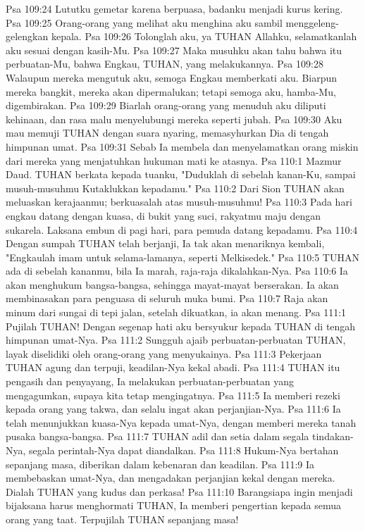Psa 109:24  Lututku gemetar karena berpuasa, badanku menjadi kurus kering.
Psa 109:25  Orang-orang yang melihat aku menghina aku sambil menggeleng-gelengkan kepala.
Psa 109:26  Tolonglah aku, ya TUHAN Allahku, selamatkanlah aku sesuai dengan kasih-Mu.
Psa 109:27  Maka musuhku akan tahu bahwa itu perbuatan-Mu, bahwa Engkau, TUHAN, yang melakukannya.
Psa 109:28  Walaupun mereka mengutuk aku, semoga Engkau memberkati aku. Biarpun mereka bangkit, mereka akan dipermalukan; tetapi semoga aku, hamba-Mu, digembirakan.
Psa 109:29  Biarlah orang-orang yang menuduh aku diliputi kehinaan, dan rasa malu menyelubungi mereka seperti jubah.
Psa 109:30  Aku mau memuji TUHAN dengan suara nyaring, memasyhurkan Dia di tengah himpunan umat.
Psa 109:31  Sebab Ia membela dan menyelamatkan orang miskin dari mereka yang menjatuhkan hukuman mati ke atasnya.
Psa 110:1  Mazmur Daud. TUHAN berkata kepada tuanku, "Duduklah di sebelah kanan-Ku, sampai musuh-musuhmu Kutaklukkan kepadamu."
Psa 110:2  Dari Sion TUHAN akan meluaskan kerajaanmu; berkuasalah atas musuh-musuhmu!
Psa 110:3  Pada hari engkau datang dengan kuasa, di bukit yang suci, rakyatmu maju dengan sukarela. Laksana embun di pagi hari, para pemuda datang kepadamu.
Psa 110:4  Dengan sumpah TUHAN telah berjanji, Ia tak akan menariknya kembali, "Engkaulah imam untuk selama-lamanya, seperti Melkisedek."
Psa 110:5  TUHAN ada di sebelah kananmu, bila Ia marah, raja-raja dikalahkan-Nya.
Psa 110:6  Ia akan menghukum bangsa-bangsa, sehingga mayat-mayat berserakan. Ia akan membinasakan para penguasa di seluruh muka bumi.
Psa 110:7  Raja akan minum dari sungai di tepi jalan, setelah dikuatkan, ia akan menang.
Psa 111:1  Pujilah TUHAN! Dengan segenap hati aku bersyukur kepada TUHAN di tengah himpunan umat-Nya.
Psa 111:2  Sungguh ajaib perbuatan-perbuatan TUHAN, layak diselidiki oleh orang-orang yang menyukainya.
Psa 111:3  Pekerjaan TUHAN agung dan terpuji, keadilan-Nya kekal abadi.
Psa 111:4  TUHAN itu pengasih dan penyayang, Ia melakukan perbuatan-perbuatan yang mengagumkan, supaya kita tetap mengingatnya.
Psa 111:5  Ia memberi rezeki kepada orang yang takwa, dan selalu ingat akan perjanjian-Nya.
Psa 111:6  Ia telah menunjukkan kuasa-Nya kepada umat-Nya, dengan memberi mereka tanah pusaka bangsa-bangsa.
Psa 111:7  TUHAN adil dan setia dalam segala tindakan-Nya, segala perintah-Nya dapat diandalkan.
Psa 111:8  Hukum-Nya bertahan sepanjang masa, diberikan dalam kebenaran dan keadilan.
Psa 111:9  Ia membebaskan umat-Nya, dan mengadakan perjanjian kekal dengan mereka. Dialah TUHAN yang kudus dan perkasa!
Psa 111:10  Barangsiapa ingin menjadi bijaksana harus menghormati TUHAN, Ia memberi pengertian kepada semua orang yang taat. Terpujilah TUHAN sepanjang masa!
